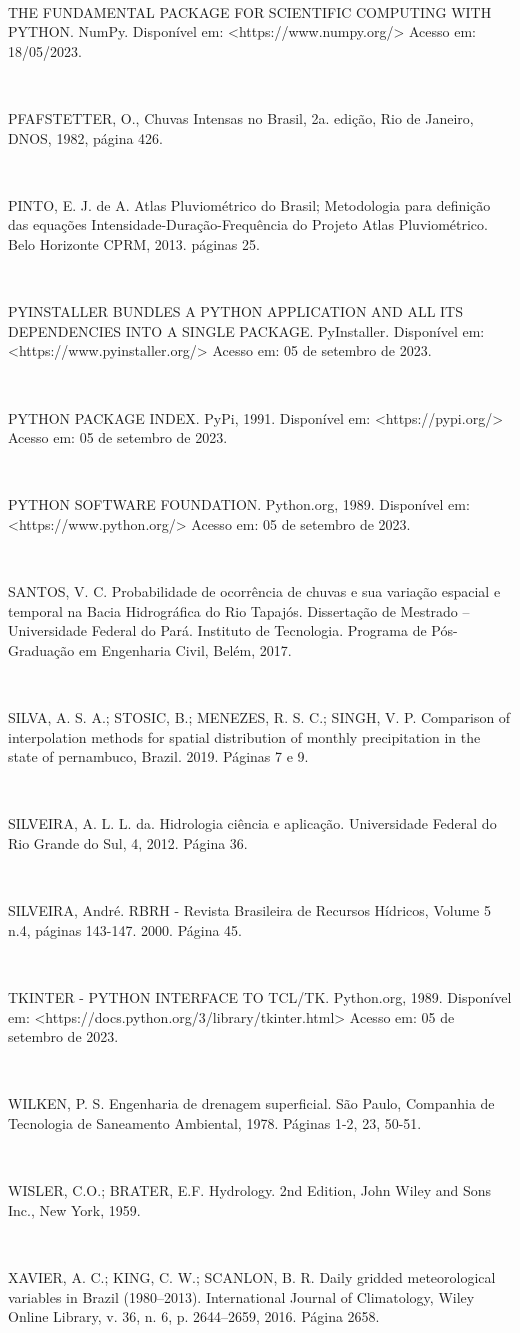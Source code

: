 \begin{flushleft}
\

THE FUNDAMENTAL PACKAGE FOR SCIENTIFIC COMPUTING WITH PYTHON. NumPy. Disponível em: <https://www.numpy.org/> Acesso em: 18/05/2023.

\

PFAFSTETTER, O., Chuvas Intensas no Brasil, 2a. edição, Rio de Janeiro, DNOS, 1982, página 426.

\

PINTO, E. J. de A. Atlas Pluviométrico do Brasil; Metodologia para definição das equações Intensidade-Duração-Frequência do Projeto Atlas Pluviométrico. Belo Horizonte CPRM, 2013. páginas 25.

\

PYINSTALLER BUNDLES A PYTHON APPLICATION AND ALL ITS DEPENDENCIES INTO A SINGLE PACKAGE. PyInstaller. Disponível em: <https://www.pyinstaller.org/> Acesso em: 05 de setembro de 2023.

\

PYTHON PACKAGE INDEX. PyPi, 1991. Disponível em: <https://pypi.org/> Acesso em: 05 de setembro de 2023.

\

PYTHON SOFTWARE FOUNDATION. Python.org, 1989. Disponível em: <https://www.python.org/> Acesso em: 05 de setembro de 2023.

\

SANTOS, V. C. Probabilidade de ocorrência de chuvas e sua variação espacial e temporal na Bacia Hidrográfica do Rio Tapajós. Dissertação de Mestrado – Universidade Federal do Pará. Instituto de Tecnologia. Programa de Pós-Graduação em Engenharia Civil, Belém, 2017.

\

SILVA, A. S. A.; STOSIC, B.; MENEZES, R. S. C.; SINGH, V. P. Comparison of interpolation methods for spatial distribution of monthly precipitation in the state of pernambuco, Brazil. 2019. Páginas 7 e 9.

\

SILVEIRA, A. L. L. da. Hidrologia ciência e aplicação. Universidade Federal do Rio Grande do Sul, 4, 2012. Página 36.

\

SILVEIRA, André. RBRH - Revista Brasileira de Recursos Hídricos, Volume 5 n.4, páginas 143-147. 2000. Página 45.

\newpage

\

TKINTER - PYTHON INTERFACE TO TCL/TK. Python.org, 1989. Disponível em: <https://docs.python.org/3/library/tkinter.html> Acesso em: 05 de setembro de 2023.

\

WILKEN, P. S. Engenharia de drenagem superficial. São Paulo, Companhia de Tecnologia de Saneamento Ambiental, 1978. Páginas 1-2, 23, 50-51.

\

WISLER, C.O.; BRATER, E.F. Hydrology. 2nd Edition, John Wiley and Sons Inc., New York, 1959.

\

XAVIER, A. C.; KING, C. W.; SCANLON, B. R. Daily gridded meteorological variables in Brazil (1980–2013). International Journal of Climatology, Wiley Online Library, v. 36, n. 6, p. 2644–2659, 2016. Página 2658.
\end{flushleft}
